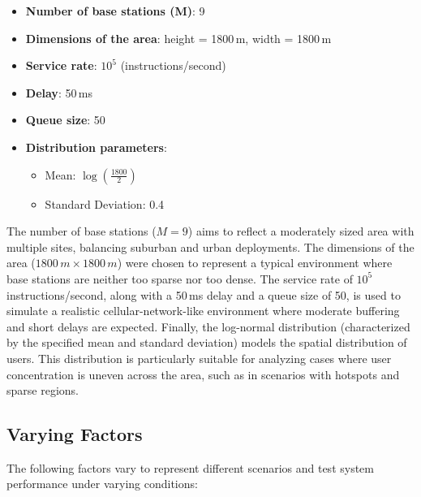 \documentclass{report}
\begin{document}
\begin{itemize}
    \item \textbf{Number of base stations (M)}: 9
    \item \textbf{Dimensions of the area}: height = 1800\,m, width = 1800\,m
    \item \textbf{Service rate}: $10^5$ (instructions/second)
    \item \textbf{Delay}: 50\,ms
    \item \textbf{Queue size}: 50
    \item \textbf{Distribution parameters}:
    \begin{itemize}
        \item Mean: $\log \left(\frac{1800}{2}\right)$
        \item Standard Deviation: 0.4
    \end{itemize}
\end{itemize}
The number of base stations ($M = 9$) aims to reflect a moderately sized area with multiple sites, balancing suburban and urban deployments.
The dimensions of the area ($1800\,m \times 1800\,m$) were chosen to represent a typical environment where base stations are neither too sparse nor too dense.
The service rate of $10^5$ instructions/second, along with a 50\,ms delay and a queue size of 50, is used to simulate a realistic cellular-network-like environment where moderate buffering and short delays are expected.
Finally, the log-normal distribution (characterized by the specified mean and standard deviation) models the spatial distribution of users.
This distribution is particularly suitable for analyzing cases where user concentration is uneven across the area, such as in scenarios with hotspots and sparse regions.

\subsection{Varying Factors}
The following factors vary to represent different scenarios and test system performance under varying conditions:
\end{document}
